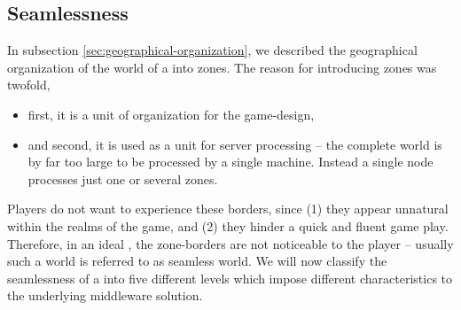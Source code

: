 \documentclass[a4paper, 10pt]{book}
\begin{document}

            \subsection{Seamlessness}
            \label{sec:seamlessness}

            In subsection \vref{sec:geographical-organization}, we described the
            geographical organization of the world of a \MMORG into zones. The
            reason for introducing zones was twofold, 
            \begin{itemize}
                \item first, it is a unit of organization for the game-design,
                \item and second, it is used as a unit for server processing -- the
                    complete world is by far too large to be processed by a single
                    machine. Instead a single node processes just one or several zones. 
            \end{itemize}
            Players do not want to experience these
            borders, since (1) they appear unnatural within the realms of the game, 
            and (2) they hinder a quick and fluent game play. 
            Therefore, in an ideal \MMORG, the zone-borders are not noticeable to
            the player -- usually such a world is referred to as seamless world. 
            We will now classify the seamlessness of a \MMORG into
            five different levels which impose different characteristics to the
            underlying middleware solution. 
\end{document}
